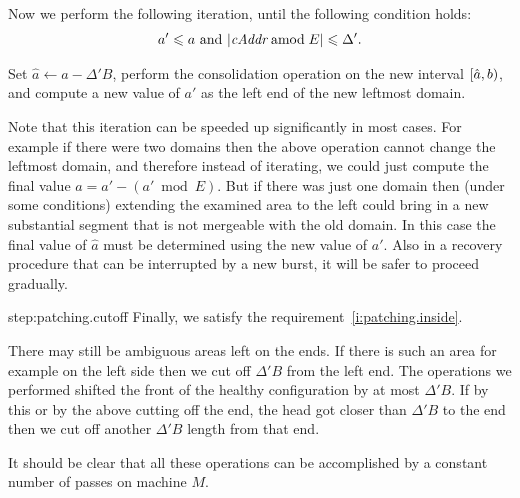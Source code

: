 \documentclass[12pt]{memoir}
\newcommand{\fld}[1]{\ensuremath{\textit{#1}}}
\def\B{B}
\newcommand{\E}{E}
\newcommand{\Addr}{\fld{Addr}}
\newcommand{\cAddr}{\fld{cAddr}}
\begin{document}
\begin{Proof}
\begin{prooofi}
Now we perform the following iteration, until the following condition holds:
 \begin{align}\label{eq:patching.terminate}
   a'\le a \text{ and }    |\cAddr \amod \E| \le \Delta'.
 \end{align}
 \begin{bullets}
\item
Set \( \hat a\gets a-\Delta'\B \), perform the consolidation operation on the 
new interval \( [\hat a,b) \), and 
compute a new value of \( a' \) as the left end of the new leftmost domain.
 \end{bullets}
Note that this iteration can be speeded up significantly in most cases.
For example if there were two domains then the above operation cannot 
change the leftmost domain,
and therefore instead of iterating, we could just compute the final value
\( \hat a = a'-(a'\bmod \E) \).
But if there was just one domain then (under some conditions) extending the examined area to the
left could bring in a new substantial segment that is not mergeable with the old domain.
In this case the final value of \( \hat a \) must be determined using the new value of \( a' \).
Also in a recovery procedure that can be interrupted by a new burst,
it will be safer to proceed gradually.
\end{prooofi} %

\begin{step+}{step:patching.cutoff}
Finally, we satisfy the requirement~\eqref{i:patching.inside}.
\end{step+}
\begin{prooofi}
There may still be ambiguous areas left on the ends.
If there is such an area for example on the left side then we cut off \( \Delta'\B \) 
from the left end.
The operations we performed shifted the front of the healthy configuration by at most
\( \Delta'\B \).
If by this or by the above cutting off the end, the head got closer than \( \Delta'\B \) to the
end then we cut off another \( \Delta'\B \) length from that end.
\end{prooofi} %

It should be clear that all these operations can be accomplished by a constant number of
passes on machine \( M \).


\end{Proof}




\end{document}
